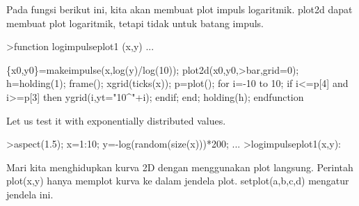 \documentclass[a4paper,10pt]{article}
\begin{document}
\begin{eulernotebook}
\begin{eulercomment}
\begin{eulercomment}
\begin{eulercomment}
\begin{eulercomment}
\begin{eulercomment}
\begin{eulercomment}
\begin{eulercomment}
\begin{eulercomment}
\begin{eulercomment}
\begin{eulercomment}
\begin{eulercomment}
Pada fungsi berikut ini, kita akan membuat plot impuls logaritmik.
plot2d dapat membuat plot logaritmik, tetapi tidak untuk batang
impuls.
\end{eulercomment}
\begin{eulerprompt}
>function logimpulseplot1 (x,y) ...
\end{eulerprompt}
\begin{eulerudf}
    \{x0,y0\}=makeimpulse(x,log(y)/log(10));
    plot2d(x0,y0,>bar,grid=0);
    h=holding(1);
    frame();
    xgrid(ticks(x));
    p=plot();
    for i=-10 to 10;
      if i<=p[4] and i>=p[3] then
         ygrid(i,yt="10^"+i);
      endif;
    end;
    holding(h);
  endfunction
\end{eulerudf}
\begin{eulercomment}
Let us test it with exponentially distributed values.
\end{eulercomment}
\begin{eulerprompt}
>aspect(1.5); x=1:10; y=-log(random(size(x)))*200; ...
>logimpulseplot1(x,y):
\end{eulerprompt}
\begin{eulercomment}
Mari kita menghidupkan kurva 2D dengan menggunakan plot langsung.
Perintah plot(x,y) hanya memplot kurva ke dalam jendela plot.
setplot(a,b,c,d) mengatur jendela ini.


\end{eulercomment}
\end{eulercomment}
\end{eulercomment}
\end{eulercomment}
\end{eulercomment}
\end{eulercomment}
\end{eulercomment}
\end{eulercomment}
\end{eulercomment}
\end{eulercomment}
\end{eulercomment}
\end{eulernotebook}
\end{document}
